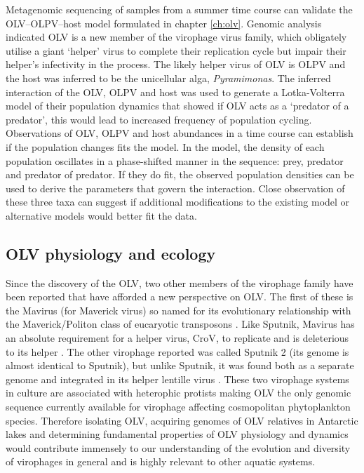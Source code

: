 Metagenomic sequencing of samples from a summer time course can validate the \ac{OLV}--\ac{OLPV}--host model formulated in chapter \ref{ch:olv}.
Genomic analysis indicated \ac{OLV} is a new member of the virophage virus family, which obligately utilise a  giant `helper' virus to complete their replication cycle but impair their helper's infectivity in the process.
The likely helper virus of \ac{OLV} is \ac{OLPV} and the host was inferred to be the unicellular alga, \emph{Pyramimonas}.
The inferred interaction of the \ac{OLV}, \ac{OLPV} and host was used to generate a Lotka-Volterra model of their population dynamics that showed if \ac{OLV} acts as a `predator of a predator', this would lead to increased frequency of population cycling.
Observations of \ac{OLV}, \ac{OLPV} and host abundances in a time course can establish if the population changes fits the model.
In the model, the density of each population oscillates in a phase-shifted manner in the sequence: prey, predator and predator of predator.
If they do fit, the observed population densities can be used to derive the parameters that govern the interaction.
Close observation of these three taxa can suggest if additional modifications to the existing model or alternative models would better fit the data.

\subsection{\acs{OLV} physiology and ecology}
Since the discovery of the \ac{OLV}, two other members of the virophage family have been reported that have afforded a new perspective on \ac{OLV}.
The first of these is the Mavirus (for Maverick virus) so named for its evolutionary relationship with the Maverick/Politon class of eucaryotic transposons \cite{Fischer2011a}.
Like Sputnik, Mavirus has an absolute requirement for a helper virus, \ac{CroV}, to replicate and is deleterious to its helper \cite{Fischer2011a}.
The other virophage reported was called Sputnik 2 (its genome is almost identical to Sputnik), but unlike Sputnik, it was found both as a separate genome and integrated in its helper lentille virus \cite{Desnues2012}.
These two virophage systems in culture are associated with heterophic protists making \ac{OLV} the only genomic sequence currently available for virophage affecting cosmopolitan phytoplankton species.
Therefore isolating \ac{OLV}, acquiring genomes of \ac{OLV} relatives in Antarctic lakes and determining fundamental properties of \ac{OLV} physiology and dynamics would contribute immensely to our understanding of the evolution and diversity of virophages in general and is highly relevant to other aquatic systems.

